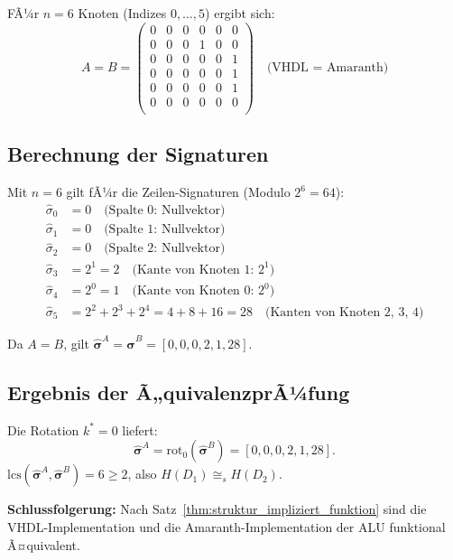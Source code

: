 ﻿\documentclass[12pt,a4paper]{report}
\begin{document}
FÃ¼r $n = 6$ Knoten (Indizes $0,\ldots,5$) ergibt sich:
\[
A = B = \begin{pmatrix}
0 & 0 & 0 & 0 & 0 & 0 \\
0 & 0 & 0 & 1 & 0 & 0 \\
0 & 0 & 0 & 0 & 0 & 1 \\
0 & 0 & 0 & 0 & 0 & 1 \\
0 & 0 & 0 & 0 & 0 & 1 \\
0 & 0 & 0 & 0 & 0 & 0 \\
\end{pmatrix}
\quad \text{(VHDL = Amaranth)}
\]

\subsection{Berechnung der Signaturen}

Mit $n = 6$ gilt fÃ¼r die Zeilen-Signaturen (Modulo $2^6 = 64$):
\begin{align*}
\hat{\sigma}_0 &= 0 \quad \text{(Spalte 0: Nullvektor)}\\
\hat{\sigma}_1 &= 0 \quad \text{(Spalte 1: Nullvektor)}\\
\hat{\sigma}_2 &= 0 \quad \text{(Spalte 2: Nullvektor)}\\
\hat{\sigma}_3 &= 2^1 = 2 \quad \text{(Kante von Knoten 1: } 2^1\text{)}\\
\hat{\sigma}_4 &= 2^0 = 1 \quad \text{(Kante von Knoten 0: } 2^0\text{)}\\
\hat{\sigma}_5 &= 2^2 + 2^3 + 2^4 = 4 + 8 + 16 = 28 \quad \text{(Kanten von Knoten 2, 3, 4)}
\end{align*}

Da $A = B$, gilt $\hat{\boldsymbol{\sigma}}^A = \hat{\boldsymbol{\sigma}}^B = [0, 0, 0, 2, 1, 28]$.

\subsection{Ergebnis der Ã„quivalenzprÃ¼fung}

Die Rotation $k^* = 0$ liefert:
\[
\hat{\boldsymbol{\sigma}}^A = \mathrm{rot}_0(\hat{\boldsymbol{\sigma}}^B) = [0, 0, 0, 2, 1, 28].
\]
$\mathrm{lcs}(\hat{\boldsymbol{\sigma}}^A, \hat{\boldsymbol{\sigma}}^B) = 6 \geq 2$, also $H(D_1) \cong_s H(D_2)$.

\textbf{Schlussfolgerung:} Nach Satz~\ref{thm:struktur_impliziert_funktion} sind die VHDL-Implementation und die Amaranth-Implementation der ALU funktional Ã¤quivalent.
\end{document}
